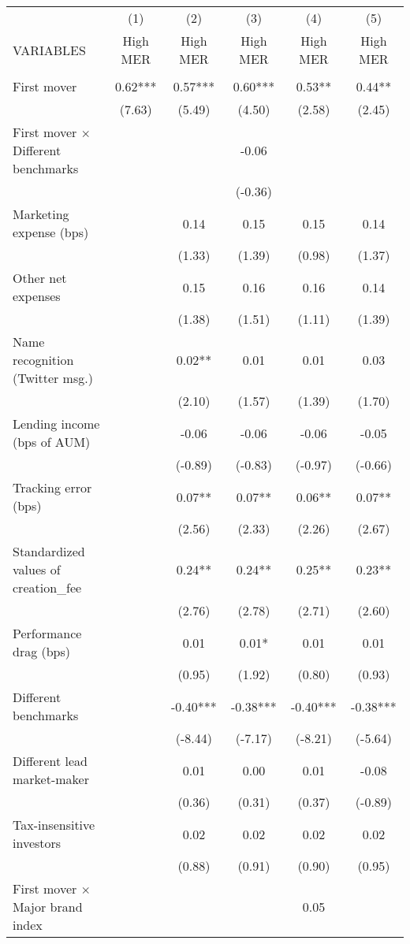 \documentclass[]{article}
\begin{document}
\begin{tabular}{lccccc} \hline
 & (1) & (2) & (3) & (4) & (5) \\
VARIABLES & High MER & High MER & High MER & High MER & High MER \\ \hline
 &  &  &  &  &  \\
First mover & 0.62*** & 0.57*** & 0.60*** & 0.53** & 0.44** \\
 & (7.63) & (5.49) & (4.50) & (2.58) & (2.45) \\
First mover $\times$ Different benchmarks &  &  & -0.06 &  &  \\
 &  &  & (-0.36) &  &  \\
Marketing expense (bps) &  & 0.14 & 0.15 & 0.15 & 0.14 \\
 &  & (1.33) & (1.39) & (0.98) & (1.37) \\
Other net expenses &  & 0.15 & 0.16 & 0.16 & 0.14 \\
 &  & (1.38) & (1.51) & (1.11) & (1.39) \\
Name recognition (Twitter msg.) &  & 0.02** & 0.01 & 0.01 & 0.03 \\
 &  & (2.10) & (1.57) & (1.39) & (1.70) \\
Lending income (bps of AUM) &  & -0.06 & -0.06 & -0.06 & -0.05 \\
 &  & (-0.89) & (-0.83) & (-0.97) & (-0.66) \\
Tracking error (bps) &  & 0.07** & 0.07** & 0.06** & 0.07** \\
 &  & (2.56) & (2.33) & (2.26) & (2.67) \\
Standardized values of creation\_fee &  & 0.24** & 0.24** & 0.25** & 0.23** \\
 &  & (2.76) & (2.78) & (2.71) & (2.60) \\
Performance drag (bps) &  & 0.01 & 0.01* & 0.01 & 0.01 \\
 &  & (0.95) & (1.92) & (0.80) & (0.93) \\
Different benchmarks &  & -0.40*** & -0.38*** & -0.40*** & -0.38*** \\
 &  & (-8.44) & (-7.17) & (-8.21) & (-5.64) \\
Different lead market-maker &  & 0.01 & 0.00 & 0.01 & -0.08 \\
 &  & (0.36) & (0.31) & (0.37) & (-0.89) \\
Tax-insensitive investors &  & 0.02 & 0.02 & 0.02 & 0.02 \\
 &  & (0.88) & (0.91) & (0.90) & (0.95) \\
First mover $\times$ Major brand index &  &  &  & 0.05 &  \\

\end{tabular}
\end{document}
